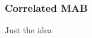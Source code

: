 \documentclass[aspectratio=169, table]{beamer}
\begin{document}
\begin{frame}
\begin{columns}
\begin{column}{.65\textwidth}
\begin{overlayarea}{\textwidth}{\textheight}
{}
\end{overlayarea}
\end{column}
\end{columns}
\end{frame}

\begin{frame}
\frametitle{Correlated MAB}
Just the idea
\end{frame}
\end{document}

